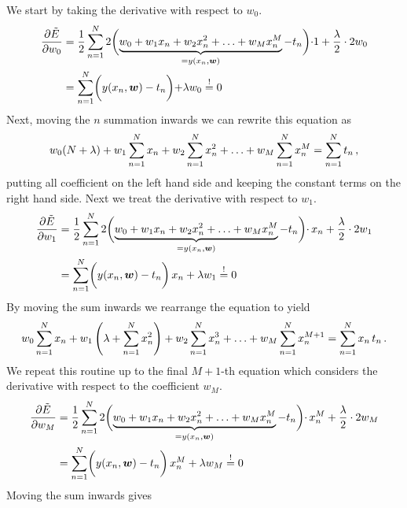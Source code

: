 \documentclass[11pt,DINA4, fleqn]{amsart}
\def\vw{\boldsymbol{w}\xspace}
\begin{document}
We start by taking the derivative with respect to $w_0$.
\begin{align}
\dfrac{\partial \tilde{E}}{\partial w_0} &= \dfrac{1}{2}\sum \displaylimits_{n = 1}^{N}
2 \biggl(\underbrace{w_0 + w_1 x_n + w_2 x_n^2 + \dotsc + w_M x_n^M}_{=y(x_n,\vw)} - t_n\biggl) \cdot 1
+ \dfrac{\lambda}{2} \cdot 2 w_0 \\
&=\sum \displaylimits_{n = 1}^{N} \biggl(y(x_n,\vw) - t_n\biggl) + \lambda w_0 \overset{!}{=} 0
\end{align}
Next, moving the $n$ summation inwards we can rewrite this equation as
\begin{align}
w_0 (N + \lambda) + w_1 \sum \displaylimits_{n = 1}^{N} x_n 
+ w_2 \sum \displaylimits_{n = 1}^{N} x_n^2 + \dotsc 
+ w_M \sum \displaylimits_{n = 1}^{N} x_n^M = \sum \displaylimits_{n = 1}^{N} t_n \, ,
\end{align}
putting all coefficient on the left hand side and keeping the constant terms on the right hand side.
Next we treat the derivative with respect to $w_1$.
\begin{align}
\dfrac{\partial \tilde{E}}{\partial w_1} &= \dfrac{1}{2}\sum \displaylimits_{n = 1}^{N}
2 \biggl(\underbrace{w_0 + w_1 x_n + w_2 x_n^2 + \dotsc + w_M x_n^M}_{=y(x_n,\vw)} - t_n\biggl) \cdot \, x_n
+ \dfrac{\lambda}{2} \cdot 2 w_1 \\
&=\sum \displaylimits_{n = 1}^{N} \biggl(y(x_n,\vw) - t_n\biggl) \, x_n + \lambda w_1 \overset{!}{=} 0
\end{align}
By moving the sum inwards we rearrange the equation to yield
\begin{align}
w_0 \sum \displaylimits_{n = 1}^{N} x_n 
+ w_1 \left( \lambda + \sum \displaylimits_{n = 1}^{N} x_n^2 \right) 
+ w_2 \sum \displaylimits_{n = 1}^{N} x_n^3 + \dotsc 
+ w_M \sum \displaylimits_{n = 1}^{N} x_n^{M + 1} = \sum \displaylimits_{n = 1}^{N} x_n \, t_n \, .
\end{align}
We repeat this routine up to the final $M+1$-th equation which considers the derivative with respect to the coefficient $w_M$.
\begin{align}
\dfrac{\partial \tilde{E}}{\partial w_M} &= \dfrac{1}{2}\sum \displaylimits_{n = 1}^{N}
2 \biggl(\underbrace{w_0 + w_1 x_n + w_2 x_n^2 + \dotsc + w_M x_n^M}_{=y(x_n,\vw)} - t_n\biggl) \cdot \, x_n^M
+ \dfrac{\lambda}{2} \cdot 2 w_M \\
&=\sum \displaylimits_{n = 1}^{N} \biggl(y(x_n,\vw) - t_n\biggl) \, x_n^M + \lambda w_M \overset{!}{=} 0
\end{align}
Moving the sum inwards gives
\end{document}
